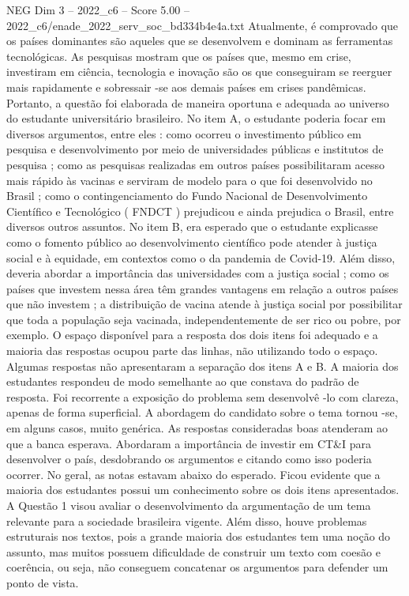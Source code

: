 \begin{textsample}{NEG Dim 3 – 2022\_c6 – Score 5.00 – 2022\_c6/enade\_2022\_serv\_soc\_bd334b4e4a.txt}
Atualmente, é comprovado que os países dominantes são aqueles que se desenvolvem e dominam as ferramentas tecnológicas.
As pesquisas mostram que os países que, mesmo em crise, investiram em ciência, tecnologia e inovação são os que conseguiram se reerguer mais rapidamente e sobressair -se aos demais países em crises pandêmicas.
Portanto, a questão foi elaborada de maneira oportuna e adequada ao universo do estudante universitário brasileiro.
No item A, o estudante poderia focar em diversos argumentos, entre eles : como ocorreu o investimento público em pesquisa e desenvolvimento por meio de universidades públicas e institutos de pesquisa ; como as pesquisas realizadas em outros países possibilitaram acesso mais rápido às vacinas e serviram de modelo para o que foi desenvolvido no Brasil ; como o contingenciamento do Fundo Nacional de Desenvolvimento Científico e Tecnológico ( FNDCT ) prejudicou e ainda prejudica o Brasil, entre diversos outros assuntos.
No item B, era esperado que o estudante explicasse como o fomento público ao desenvolvimento científico pode atender à justiça social e à equidade, em contextos como o da pandemia de Covid-19.
Além disso, deveria abordar a importância das universidades com a justiça social ; como os países que investem nessa área têm grandes vantagens em relação a outros países que não investem ; a distribuição de vacina atende à justiça social por possibilitar que toda a população seja vacinada, independentemente de ser rico ou pobre, por exemplo.
O espaço disponível para a resposta dos dois itens foi adequado e a maioria das respostas ocupou parte das linhas, não utilizando todo o espaço.
Algumas respostas não apresentaram a separação dos itens A e B.
A maioria dos estudantes respondeu de modo semelhante ao que constava do padrão de resposta.
Foi recorrente a exposição do problema sem desenvolvê -lo com clareza, apenas de forma superficial.
A abordagem do candidato sobre o tema tornou -se, em alguns casos, muito genérica.
As respostas consideradas boas atenderam ao que a banca esperava.
Abordaram a importância de investir em CT\&I para desenvolver o país, desdobrando os argumentos e citando como isso poderia ocorrer.
No geral, as notas estavam abaixo do esperado.
Ficou evidente que a maioria dos estudantes possui um conhecimento sobre os dois itens apresentados.
A Questão 1 visou avaliar o desenvolvimento da argumentação de um tema relevante para a sociedade brasileira vigente.
Além disso, houve problemas estruturais nos textos, pois a grande maioria dos estudantes tem uma noção do assunto, mas muitos possuem dificuldade de construir um texto com coesão e coerência, ou seja, não conseguem concatenar os argumentos para defender um ponto de vista.

\end{textsample}

